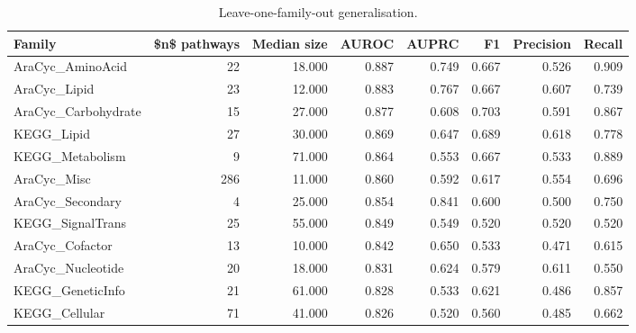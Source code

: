 \begin{table}[htbp]
\centering
\caption{Leave-one-family-out generalisation.}
\label{tab:lofo_recomputed}
\begin{tabular}{lrrrrrrr}
\toprule
Family & \$n\$ pathways & Median size & AUROC & AUPRC & F1 & Precision & Recall \\
\midrule
AraCyc\_AminoAcid & 22 & 18.000 & 0.887 & 0.749 & 0.667 & 0.526 & 0.909 \\
AraCyc\_Lipid & 23 & 12.000 & 0.883 & 0.767 & 0.667 & 0.607 & 0.739 \\
AraCyc\_Carbohydrate & 15 & 27.000 & 0.877 & 0.608 & 0.703 & 0.591 & 0.867 \\
KEGG\_Lipid & 27 & 30.000 & 0.869 & 0.647 & 0.689 & 0.618 & 0.778 \\
KEGG\_Metabolism & 9 & 71.000 & 0.864 & 0.553 & 0.667 & 0.533 & 0.889 \\
AraCyc\_Misc & 286 & 11.000 & 0.860 & 0.592 & 0.617 & 0.554 & 0.696 \\
AraCyc\_Secondary & 4 & 25.000 & 0.854 & 0.841 & 0.600 & 0.500 & 0.750 \\
KEGG\_SignalTrans & 25 & 55.000 & 0.849 & 0.549 & 0.520 & 0.520 & 0.520 \\
AraCyc\_Cofactor & 13 & 10.000 & 0.842 & 0.650 & 0.533 & 0.471 & 0.615 \\
AraCyc\_Nucleotide & 20 & 18.000 & 0.831 & 0.624 & 0.579 & 0.611 & 0.550 \\
KEGG\_GeneticInfo & 21 & 61.000 & 0.828 & 0.533 & 0.621 & 0.486 & 0.857 \\
KEGG\_Cellular & 71 & 41.000 & 0.826 & 0.520 & 0.560 & 0.485 & 0.662 \\
\bottomrule
\end{tabular}

\end{table}

